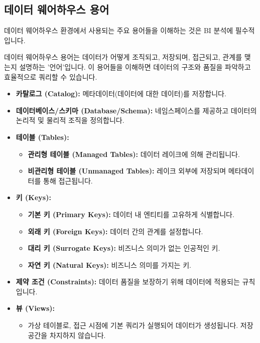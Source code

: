 \documentclass[11pt,a4paper]{article}
\begin{document}
\subsection{데이터 웨어하우스 용어}
데이터 웨어하우스 환경에서 사용되는 주요 용어들을 이해하는 것은 BI 분석에 필수적입니다.

\begin{tcolorbox}[mybox={핵심 요약: 데이터 구조의 언어}]
데이터 웨어하우스 용어는 데이터가 어떻게 조직되고, 저장되며, 접근되고, 관계를 맺는지 설명하는 '언어'입니다. 이 용어들을 이해하면 데이터의 구조와 품질을 파악하고 효율적으로 쿼리할 수 있습니다.
\end{tcolorbox}

\begin{itemize}
    \item \textbf{카탈로그 (Catalog):} 메타데이터(데이터에 대한 데이터)를 저장합니다.
    \item \textbf{데이터베이스/스키마 (Database/Schema):} 네임스페이스를 제공하고 데이터의 논리적 및 물리적 조직을 정의합니다.
    \item \textbf{테이블 (Tables):}
    \begin{itemize}
        \item \textbf{관리형 테이블 (Managed Tables):} 데이터 레이크에 의해 관리됩니다.
        \item \textbf{비관리형 테이블 (Unmanaged Tables):} 레이크 외부에 저장되며 메타데이터를 통해 접근됩니다.
    \end{itemize}
    \item \textbf{키 (Keys):}
    \begin{itemize}
        \item \textbf{기본 키 (Primary Keys):} 데이터 내 엔티티를 고유하게 식별합니다.
        \item \textbf{외래 키 (Foreign Keys):} 데이터 간의 관계를 설정합니다.
        \item \textbf{대리 키 (Surrogate Keys):} 비즈니스 의미가 없는 인공적인 키.
        \item \textbf{자연 키 (Natural Keys):} 비즈니스 의미를 가지는 키.
    \end{itemize}
    \item \textbf{제약 조건 (Constraints):} 데이터 품질을 보장하기 위해 데이터에 적용되는 규칙입니다.
    \item \textbf{뷰 (Views):}
    \begin{itemize}
        \item 가상 테이블로, 접근 시점에 기본 쿼리가 실행되어 데이터가 생성됩니다. 저장 공간을 차지하지 않습니다.

\end{itemize}
\end{itemize}
\end{document}
